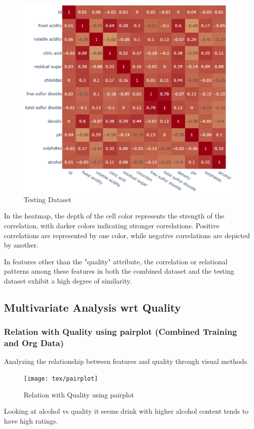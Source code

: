 \begin{figure}[H]
	\centering
	\includegraphics[width=0.7\linewidth]{tex/TestingDataset}
	\caption{Testing Dataset}
	\label{fig:testingdataset}
\end{figure}

In the heatmap, the depth of the cell color represents the strength of the correlation, with darker colors indicating stronger correlations. Positive correlations are represented by one color, while negative correlations are depicted by another.

In features other than the "quality" attribute, the correlation or relational patterns among these features in both the combined dataset and the testing dataset exhibit a high degree of similarity.

\subsection{Multivariate Analysis wrt Quality}\phantom{...}

\subsubsection{Relation with Quality using pairplot (Combined Training and Org Data)}\phantom{...}

Analyzing the relationship between features and quality through visual methods.

\begin{figure}[H]
	\centering
	\texttt{[image: tex/pairplot]}
	\caption{Relation with Quality using pairplot}
	\label{fig:pairplot}
\end{figure}

Looking at alcohol vs quality it seems drink with higher alcohol content tends to have high ratings.

